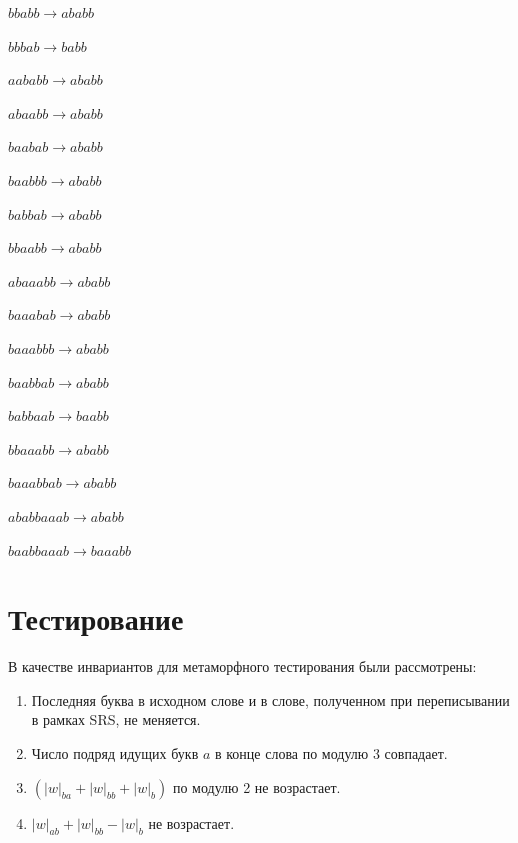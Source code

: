 \documentclass[a4paper, 14pt]{extarticle}
\begin{document}
$bbabb \to ababb$

$bbbab \to babb$

$aababb \to ababb$

$abaabb \to ababb$

$baabab \to ababb$

$baabbb \to ababb$

$babbab \to ababb$

$bbaabb \to ababb$

$abaaabb \to ababb$

$baaabab \to ababb$

$baaabbb \to ababb$

$baabbab \to ababb$

$babbaab \to baabb$

$bbaaabb \to ababb$

$baaabbab \to ababb$

$ababbaaab \to ababb$

$baabbaaab \to baaabb$

\section{Тестирование}

В качестве инвариантов для метаморфного тестирования были рассмотрены:
\begin{enumerate}[topsep=0pt,parsep=-5pt]
    \item Последняя буква в исходном слове и в слове, полученном при переписывании в рамках SRS, не меняется.
    \item Число подряд идущих букв $a$ в конце слова по модулю 3 совпадает.
    \item $(|w|_{ba} + |w|_{bb} + |w|_b)$ по модулю 2 не возрастает.
    \item $|w|_{ab} + |w|_{bb} - |w|_b$ не возрастает.
\end{enumerate}
\end{document}

